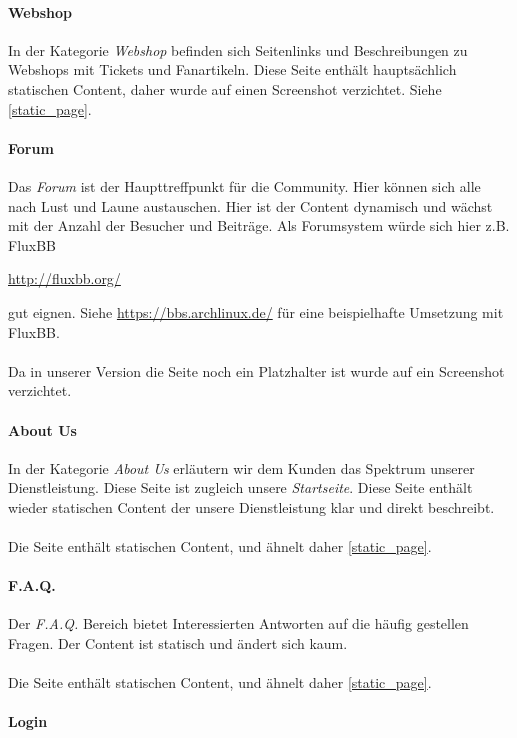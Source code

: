 \paragraph{Webshop}
In der Kategorie \emph{Webshop} befinden sich Seitenlinks und Beschreibungen zu
Webshops mit Tickets und Fanartikeln. Diese Seite enthält hauptsächlich
statischen Content, daher wurde auf einen Screenshot verzichtet. Siehe
\ref{static_page}.

\paragraph{Forum}
Das \emph{Forum} ist der Haupttreffpunkt für die Community. Hier können sich
alle nach Lust und Laune austauschen. Hier ist der Content dynamisch und wächst
mit der Anzahl der Besucher und Beiträge. Als Forumsystem würde sich hier
z.B. FluxBB 
\begin{center}
    \url{http://fluxbb.org/}
\end{center}
gut eignen. Siehe \url{https://bbs.archlinux.de/} für eine beispielhafte
Umsetzung mit FluxBB.
\\
\\
Da in unserer Version die Seite noch ein Platzhalter ist wurde auf ein Screenshot
verzichtet.


\paragraph{About Us}
In der Kategorie \emph{About Us} erläutern wir dem Kunden das Spektrum unserer
Dienstleistung. Diese Seite ist zugleich unsere \emph{Startseite}. Diese Seite
enthält wieder statischen Content der unsere Dienstleistung klar und direkt
beschreibt.
\\
\\
Die Seite enthält statischen Content, und ähnelt daher \ref{static_page}.

\paragraph{F.A.Q.}
Der \emph{F.A.Q.} Bereich bietet Interessierten Antworten auf die häufig
gestellen Fragen. Der Content ist statisch und ändert sich kaum. 
\\
\\
Die Seite enthält statischen Content, und ähnelt daher \ref{static_page}.

\paragraph{Login}

